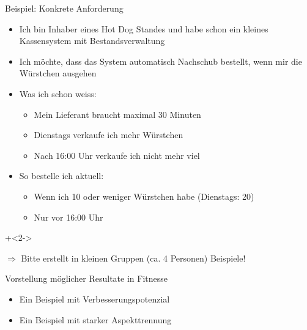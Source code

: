 \begin{frame}{Beispiel: Konkrete Anforderung}

\begin{itemize}
	\item Ich bin Inhaber eines Hot Dog Standes und habe schon ein kleines Kassensystem mit Bestandsverwaltung
	\item Ich möchte, dass das System automatisch Nachschub bestellt, wenn mir die Würstchen ausgehen
	
	\item Was ich schon weiss:
	\begin{itemize}
		\item Mein Lieferant braucht maximal 30 Minuten
		\item Dienstags verkaufe ich mehr Würstchen
		\item Nach 16:00 Uhr verkaufe ich nicht mehr viel
	\end{itemize}
	
	\item So bestelle ich aktuell:
	\begin{itemize}
		\item Wenn ich 10 oder weniger Würstchen habe (Dienstags: 20)
		\item Nur vor 16:00 Uhr
	\end{itemize}
\end{itemize}

\onslide+<2->
	
$\Rightarrow$ Bitte erstellt in kleinen Gruppen (ca. 4 Personen) Beispiele!

\end{frame}

\begin{frame}{Vorstellung möglicher Resultate in Fitnesse}

\begin{itemize}
	\item Ein Beispiel mit Verbesserungspotenzial
	\item Ein Beispiel mit starker Aspekttrennung
\end{itemize}

\end{frame}

